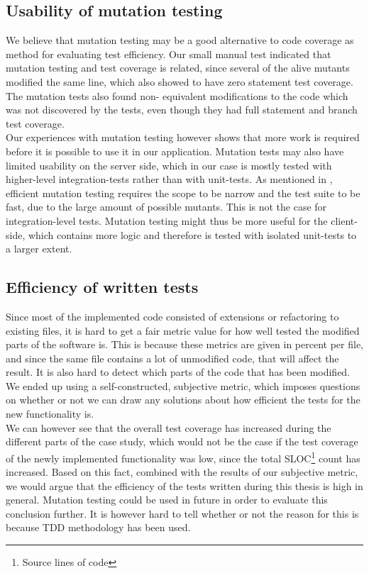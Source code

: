\subsection{Usability of mutation testing}

We believe that mutation testing may be a good alternative to code
coverage as method for evaluating test efficiency. Our small manual test
indicated that mutation testing and test coverage is related, since
several of the alive mutants modified the same line, which also showed
to have zero statement test coverage. The mutation tests also found non-
equivalent modifications to the code which was not discovered by the
tests, even though they had full statement and branch test coverage.\\

Our experiences with mutation testing however shows that more work is
required before it is possible to use it in our application. Mutation
tests may also have limited usability on the server side, which in our
case is mostly tested with higher-level integration-tests rather than
with unit-tests. As mentioned in , efficient
mutation testing requires the scope to be narrow and the test suite to
be fast, due to the large amount of possible mutants. This is not the
case for integration-level tests. Mutation testing might thus be more
useful for the client-side, which contains more logic and therefore is
tested with isolated unit-tests to a larger extent.\\


\subsection{Efficiency of written tests}

Since most of the implemented code consisted of extensions or
refactoring to existing files, it is hard to get a fair metric value for
how well tested the modified parts of the software is. This is because
these metrics are given in percent per file, and since the same file
contains a lot of unmodified code, that will affect the result. It is
also hard to detect which parts of the code that has been modified. We
ended up using a self-constructed, subjective metric, which imposes
questions on whether or not we can draw any solutions about how
efficient the tests for the new functionality is.\\

We can however see that the overall test coverage has increased during
the different parts of the case study, which would not be the case if
the test coverage of the newly implemented functionality was low, since
the total SLOC\footnote{Source lines of code} count has increased. Based
on this fact, combined with the results of our subjective metric, we
would argue that the efficiency of the tests written during this thesis
is high in general. Mutation testing could be used in future in order to
evaluate this conclusion further. It is however hard to tell whether or
not the reason for this is because TDD methodology has been used.\\

